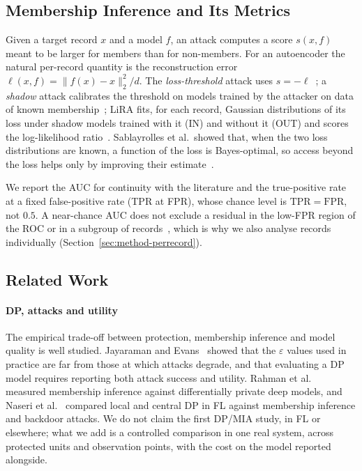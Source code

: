 \subsection{Membership Inference and Its Metrics}
\label{sec:bg-mia}

Given a target record $x$ and a model $f$, an attack computes a score $s(x,f)$
meant to be larger for members than for non-members. For an autoencoder the
natural per-record quantity is the reconstruction error
$\ell(x,f) = \lVert f(x) - x \rVert_2^2 / d$. The \emph{loss-threshold} attack
uses $s = -\ell$~\cite{yeom2018privacy}; a \emph{shadow} attack calibrates the
threshold on models trained by the attacker on data of known
membership~\cite{shokri2017membership,salem2019mlleaks}; LiRA fits, for each
record, Gaussian distributions of its loss under shadow models trained with it
(IN) and without it (OUT) and scores the log-likelihood
ratio~\cite{carlini2022membership}. Sablayrolles et al.\ showed that, when the
two loss distributions are known, a function of the loss is Bayes-optimal, so
access beyond the loss helps only by improving their
estimate~\cite{sablayrolles2019whitebox}.

We report the AUC for continuity with the literature and the true-positive
rate at a fixed false-positive rate (TPR at FPR), whose chance level is
$\mathrm{TPR} = \mathrm{FPR}$, not $0.5$. A near-chance AUC does not exclude a
residual in the low-FPR region of the ROC or in a subgroup of
records~\cite{carlini2022membership}, which is why we also analyse records
individually (Section~\ref{sec:method-perrecord}).

\subsection{Related Work}
\label{sec:related}

\paragraph{DP, attacks and utility} The empirical trade-off between
protection, membership inference and model quality is well studied. Jayaraman
and Evans~\cite{jayaraman2019evaluating} showed that the $\varepsilon$ values
used in practice are far from those at which attacks degrade, and that
evaluating a DP model requires reporting both attack success and utility.
Rahman et al.~\cite{rahman2018membership} measured membership inference
against differentially private deep models, and Naseri
et al.~\cite{naseri2022local} compared local and central DP in FL against
membership inference and backdoor attacks. We do not claim the first DP/MIA
study, in FL or elsewhere; what we add is a controlled comparison in one real
system, across protected units and observation points, with the cost on the
model reported alongside.

